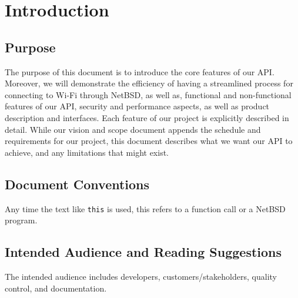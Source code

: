 \section{Introduction}

\subsection{Purpose}

The purpose of this document is to introduce the core features of our API. Moreover, we will demonstrate the efficiency 
of having a streamlined process for connecting to Wi-Fi through NetBSD, as well as, functional and non-functional features 
of our API, security and performance aspects, as well as product description and interfaces. Each feature of our project is 
explicitly described in detail. While our vision and scope document appends the schedule and requirements for our project, this 
document describes what we want our API to achieve, and any limitations that might exist. 

\subsection{Document Conventions}
Any time the text like \texttt{this} is used, this refers to a function call or
a NetBSD program.

\subsection{Intended Audience and Reading Suggestions}

The intended audience includes developers, customers/stakeholders, quality control, and documentation.


